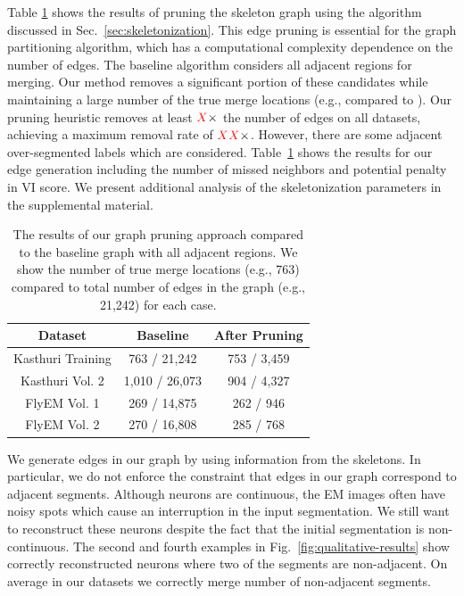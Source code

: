 Table \ref{table:skeletonization} shows the results of pruning the skeleton graph using the algorithm discussed in Sec.~\ref{sec:skeletonization}. 
This edge pruning is essential for the graph partitioning algorithm, which has a computational complexity dependence on the number of edges. 
The baseline algorithm considers all adjacent regions for merging. 
Our method removes a significant portion of these candidates while maintaining a large number of the true merge locations (e.g.,  compared to ). 
Our pruning heuristic removes at least $\textcolor{red}{X}\times$ the number of edges on all datasets, achieving a maximum removal rate of $\textcolor{red}{XX}\times$.
However, there are some adjacent over-segmented labels which are considered. 
Table~\ref{table:skeletonization} shows the results for our edge generation including the number of missed neighbors and potential penalty in VI score.
We present additional analysis of the skeletonization parameters in the supplemental material.

\begin{table}
	\centering
	\small
	\begin{tabular}{c c c} \hline
		\textbf{Dataset} & \textbf{Baseline} & \textbf{After Pruning} \\ \hline
		Kasthuri Training & 763 / 21,242 & 753 / 3,459 \\
		Kasthuri Vol. 2 & 1,010 / 26,073 & 904 / 4,327 \\
		FlyEM Vol. 1 & 269 / 14,875 & 262 / 946 \\
		FlyEM Vol. 2 & 270 / 16,808 & 285 / 768 \\ \hline
	\end{tabular}
	\caption{The results of our graph pruning approach compared to the baseline graph with all adjacent regions. We show the number of true merge locations (e.g., 763) compared to total number of edges in the graph (e.g., 21,242) for each case.}
	\label{table:skeletonization}
\end{table}

We generate edges in our graph by using information from the skeletons. 
In particular, we do not enforce the constraint that edges in our graph correspond to adjacent segments.
Although neurons are continuous, the EM images often have noisy spots which cause an interruption in the input segmentation.
We still want to reconstruct these neurons despite the fact that the initial segmentation is non-continuous. 
The second and fourth examples in Fig.~\ref{fig:qualitative-results} show correctly reconstructed neurons where two of the segments are non-adjacent. 
On average in our datasets we correctly merge  number of non-adjacent segments. 

